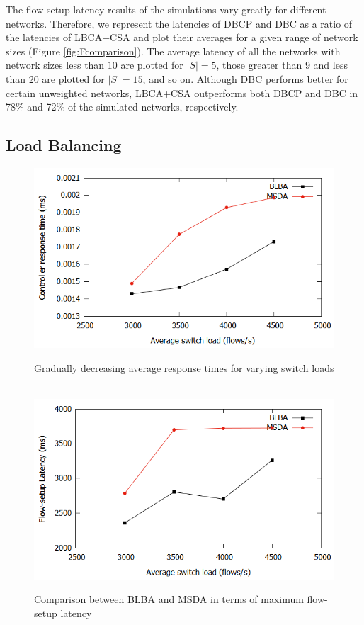 \documentclass[final,5p,times]{cas-dc}
\begin{document}
	The flow-setup latency results of the simulations vary greatly for different networks. Therefore, we represent the latencies of DBCP and DBC as a ratio of the latencies of LBCA+CSA and plot their averages for a given range of network sizes (Figure \ref{fig:Fcomparison}). The average latency of all the networks with network sizes less than $10$ are plotted for $|S|=5$, those greater than 9 and less than 20 are plotted for $|S|=15$, and so on. Although DBC performs better for certain unweighted networks, LBCA+CSA outperforms both DBCP and DBC in 78\% and 72\% of the simulated networks, respectively.
	
	\subsection{Load Balancing} \label{LoadAnalysis}
	
	\begin{figure}[t]
		\centering
		\includegraphics[width=\linewidth]{Images/response_comparison.png}
		\caption{Gradually decreasing average response times for varying switch loads} \label{fig:Rcomparison}
		~
		\centering
		\includegraphics[width=\linewidth]{Images/omega_comparison.png}
		\caption{Comparison between BLBA and MSDA in terms of maximum flow-setup latency} \label{fig:Ocomparison}
	\end{figure}
\end{document}
